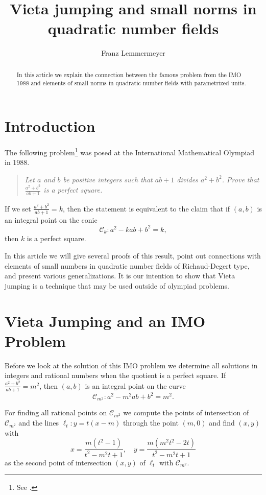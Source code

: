\documentclass{amsart}
\title{Vieta jumping and small norms in quadratic number fields}
\author{Franz Lemmermeyer}
\newcommand{\cC}{{\mathcal C}}
\begin{document}
\begin{abstract}
  In this article we explain the connection between the famous problem
  from the IMO 1988 and elements of small norms in quadratic number
  fields with parametrized units.
\end{abstract}

\maketitle

\section*{Introduction}
The following problem\footnote{See \cite{LQNF}.} was posed
at the International Mathematical Olympiad in 1988. 

\begin{quote}
  {\em Let $a$ and $b$ be positive integers such that $ab + 1$ divides
    $a^2 + b^2$. Prove that $\frac{a^2 + b^2}{ab+1}$ is a perfect square.}
\end{quote}

If we set $\frac{a^2 + b^2}{ab+1} = k$, then the statement is
equivalent to the claim that if $(a,b)$ is an integral point on the
conic
\begin{equation}\label{EC0}
  \cC_k: a^2 - kab + b^2 = k,
\end{equation}
then $k$ is a perfect square.

In this article we will give several proofs of this result,
point out connections with elements of small numbers in quadratic
number fields of Richaud-Degert type, and present various generalizations.
It is our intention to show that Vieta jumping is a technique that may
be used outside of olympiad problems.

\section{Vieta Jumping and an IMO Problem}

Before we look at the solution of this IMO problem we determine all solutions
in integers and rational numbers when the quotient is a perfect square.
If $\frac{a^2 + b^2}{ab+1} = m^2$, then $(a,b)$ is an integral point
on the curve
\begin{equation}\label{EC1}
  \cC_{m^2}: a^2 - m^2 ab + b^2 = m^2.
\end{equation}

For finding all rational points on $\cC_{m^2}$ we compute the points of
intersection of $\cC_{m^2}$ and the lines $\ell_t: y = t(x-m)$ through the
point $(m,0)$ and find $(x,y)$ with
\begin{equation}\label{Prat}
  x = \frac{m(t^2-1)}{t^2 - m^2t + 1}, \quad
  y = \frac{m(m^2t^2 - 2t)}{t^2 - m^2t + 1}
\end{equation}
as the second point of intersection $(x,y)$ of $\ell_t$ with $\cC_{m^2}$.
\end{document}
